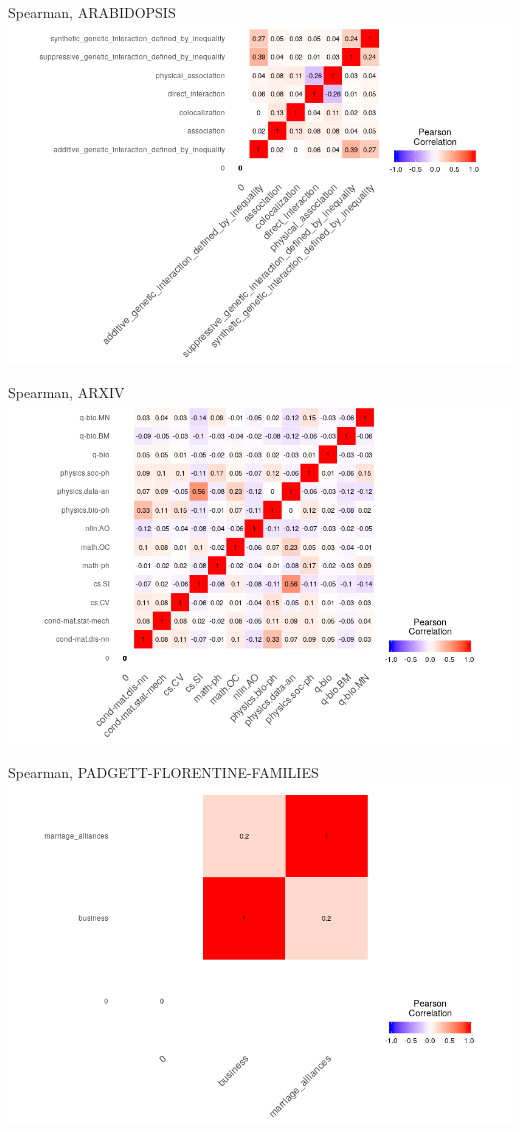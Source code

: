 \documentclass{beamer}
\begin{document}
\begin{frame}{Spearman, ARABIDOPSIS} 
\includegraphics[scale=0.46]{heamapSpearman1}
\end{frame}
\begin{frame}{Spearman, ARXIV} 
\includegraphics[scale=0.46]{heamapSpearman2}
\end{frame}
\begin{frame}{Spearman, PADGETT-FLORENTINE-FAMILIES} 
\includegraphics[scale=0.46]{heamapSpearman3}
\end{frame}
\end{document}
